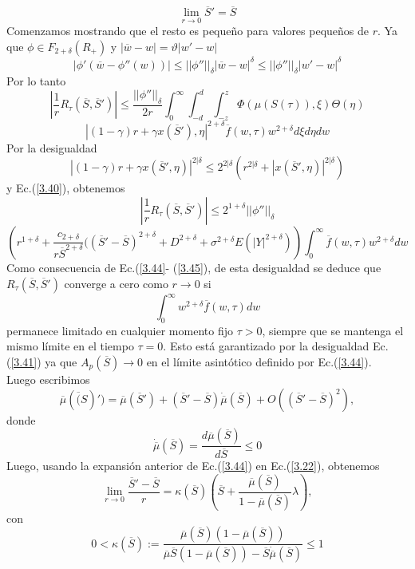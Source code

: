 \documentclass[12pt,a4paper]{article}
\begin{document}
\begin{equation}
\lim_{r\rightarrow 0}\overline{S}'=\overline{S} \label{3.45}
\end{equation}
Comenzamos mostrando que el resto es pequeño para valores pequeños de $ r $. Ya que $\phi \in F_{2+\delta}(R_{+})$ y $|\overline{w}-w|= \vartheta|w'-w|$
\begin{equation}
|\phi'(\overline{w}-\phi''(w))|\leq ||\phi''||_{\delta}|\overline{w}-w|^{\delta}\leq ||\phi''||_{\delta}|w'-w|^{\delta} \label{3.46}
\end{equation}
Por lo tanto
$$
\left|\frac{1}{r}R_{\tau}(\overline{S},\overline{S}')\right|\leq \frac{||\phi''||_{\delta}}{2r}\int^{\infty}_{0}\int^{d}_{-d}\int^{z}_{-z}\Phi(\mu(S(\tau)),\xi)\Theta(\eta)
$$
$$
|(1-\gamma)r+\gamma x(\overline{S}'),\eta|^{2+\delta}\overline{f}(w,\tau)w^{2+\delta} d\xi d\eta dw
$$
Por la desigualdad
$$
|(1-\gamma)r+\gamma x (\overline{S}',\eta)|^{2|\delta}\leq 2^{2|\delta}\left(r^{2|\delta}+|x(\overline{S}',\eta)|^{2|\delta} \right)
$$
y Ec.(\ref{3.40}), obtenemos
$$
|\frac{1}{r}R_{\tau}(\overline{S},\overline{S}')|\leq 2^{1+\delta}||\phi''||_{\delta}
$$
$$
\left(r^{1+\delta}+\frac{c_{2+\delta}}{r\overline{S}^{2+\delta}}((\overline{S}'-\overline{S})^{2+\delta}+D^{2+\delta}+\sigma^{2+\delta}E(|Y|^{2+\delta})\right)\int^{\infty}_{0}\overline{f}(w,\tau)w^{2+\delta}dw
$$
Como consecuencia de Ec.(\ref{3.44}- (\ref{3.45}), de esta desigualdad se deduce que $R_{\tau}(\overline{S},\overline{S}') $ converge a cero como $ r\rightarrow 0 $ si
$$
\int^{\infty}_{0} w^{2+\delta}\overline{f}(w,\tau)dw
$$
permanece limitado en cualquier momento fijo $\tau > 0$, siempre que se mantenga el mismo límite en el tiempo $\tau = 0$. Esto está garantizado por la desigualdad Ec.(\ref{3.41}) ya que $ A_{p}(\overline{S})\rightarrow0 $ en el límite asintótico definido por Ec.(\ref{3.44}).\\
Luego escribimos
$$
\overline{\mu}(\overline(S)')=\overline{\mu}(\overline{S}')+(\overline{S}'-\overline{S})\dot{\overline{\mu}}(\overline{S})+O((\overline{S}'-\overline{S})^2),
$$
donde
$$
\dot{\overline{\mu}}(\overline{S})=\frac{d\overline{\mu}(\overline{S})}{d\overline{S}} \leq 0
$$
Luego, usando la expansión anterior de Ec.(\ref{3.44}) en Ec.(\ref{3.22}), obtenemos
\begin{equation}
\lim_{r\rightarrow 0}\frac{\overline{S}'-\overline{S}}{r}=\kappa (\overline{S})\left(\overline{S}+\frac{\overline{\mu}(\overline{S})}{1-\overline{\mu}(\overline{S})}\lambda \right),\label{3.47}
\end{equation}
con
\begin{equation}
0<\kappa (\overline{S}):=\frac{\overline{\mu}(\overline{S})(1- \overline{\mu}(\overline{S}))}{\overline{\mu}\overline{S}(1-\overline{\mu}(\overline{S}))-\overline{S}\dot{\overline{\mu}}(\overline{S})}\leq 1\label{3.48}
\end{equation}
\end{document}

